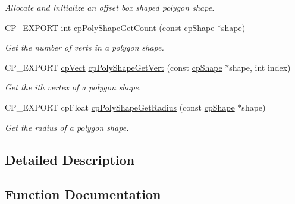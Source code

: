 \begin{DoxyCompactItemize}
\begin{DoxyCompactList}\small\item\em Allocate and initialize an offset box shaped polygon shape. \end{DoxyCompactList}\item 
\mbox{\label{group__cpPolyShape_gaa6ae842d55ceb9865e6e80bc1db9634d}} 
C\+P\+\_\+\+E\+X\+P\+O\+RT int \hyperlink{group__cpPolyShape_gaa6ae842d55ceb9865e6e80bc1db9634d}{cp\+Poly\+Shape\+Get\+Count} (const \hyperlink{structcpShape}{cp\+Shape} $\ast$shape)
\begin{DoxyCompactList}\small\item\em Get the number of verts in a polygon shape. \end{DoxyCompactList}\item 
\mbox{\label{group__cpPolyShape_gaff54ae9c1055cf5178aa5297c401f844}} 
C\+P\+\_\+\+E\+X\+P\+O\+RT \hyperlink{structcpVect}{cp\+Vect} \hyperlink{group__cpPolyShape_gaff54ae9c1055cf5178aa5297c401f844}{cp\+Poly\+Shape\+Get\+Vert} (const \hyperlink{structcpShape}{cp\+Shape} $\ast$shape, int index)
\begin{DoxyCompactList}\small\item\em Get the {\ttfamily ith} vertex of a polygon shape. \end{DoxyCompactList}\item 
\mbox{\label{group__cpPolyShape_gadaa9274e569afd49c025b2e12bb022d8}} 
C\+P\+\_\+\+E\+X\+P\+O\+RT cp\+Float \hyperlink{group__cpPolyShape_gadaa9274e569afd49c025b2e12bb022d8}{cp\+Poly\+Shape\+Get\+Radius} (const \hyperlink{structcpShape}{cp\+Shape} $\ast$shape)
\begin{DoxyCompactList}\small\item\em Get the radius of a polygon shape. \end{DoxyCompactList}\end{DoxyCompactItemize}


\subsection{Detailed Description}


\subsection{Function Documentation}
\mbox{\label{group__cpPolyShape_ga8f30c48538498234bed45abc3c16b80d}} 
